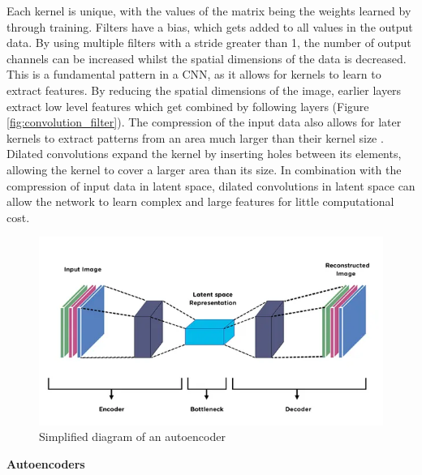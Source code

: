 \documentclass[twocolumn]{article}
\begin{document}
Each kernel is unique, with the values of the matrix being the weights learned by through training.
Filters have a bias, which gets added to all values in the output data.
By using multiple filters with a stride greater than 1, the number of output channels can be increased whilst the spatial dimensions of the data is decreased.
This is a fundamental pattern in a CNN, as it allows for kernels to learn to extract features.
By reducing the spatial dimensions of the image, earlier layers extract low level features which get combined by following layers (Figure \ref{fig:convolution_filter}).
The compression of the input data also allows for later kernels to extract patterns from an area much larger than their kernel size .
Dilated convolutions expand the kernel by inserting holes between its elements, allowing the kernel to cover a larger area than its size\autocite{dumoulinGuideConvolutionArithmetic2018}.
In combination with the compression of input data in latent space, dilated convolutions in latent space can allow the network to learn complex and large features for little computational cost.


\begin{figure}[htbp]
\centering
\includegraphics[width=.9\linewidth]{images/autoencoder.png}
\caption{\label{fig:autoencoder}Simplified diagram of an autoencoder\autocite{birlaAutoencoders2019}}
\end{figure}

\textbf{Autoencoders}
\end{document}
